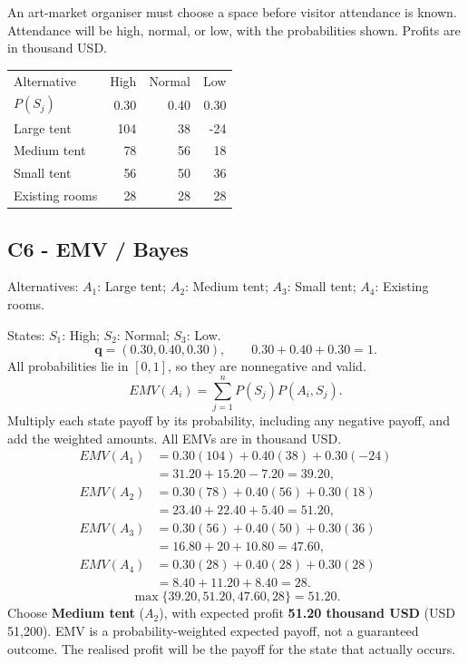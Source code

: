\clearpage
{}
An art-market organiser must choose a space before visitor attendance is known. Attendance will be high, normal, or low, with the probabilities shown. Profits are in thousand USD.
\begin{center}\small\setlength{\tabcolsep}{4pt}
\begin{tabular}{@{}lrrr@{}}\toprule
Alternative&High&Normal&Low\\
$P(S_j)$&0.30&0.40&0.30\\\midrule
Large tent&104&38&-24\\
Medium tent&78&56&18\\
Small tent&56&50&36\\
Existing rooms&28&28&28\\\bottomrule
\end{tabular}\end{center}
\subsection*{C6 - EMV / Bayes }
\label{sol:art-market-space-c6}
Alternatives: $A_1$: Large tent; $A_2$: Medium tent; $A_3$: Small tent; $A_4$: Existing rooms.\par
States: $S_1$: High; $S_2$: Normal; $S_3$: Low.
\[\boldsymbol{q}=(0.30,0.40,0.30),\qquad 0.30+0.40+0.30=1.\]
All probabilities lie in $[0,1]$, so they are nonnegative and valid.
\[EMV(A_i)=\sum_{j=1}^{n}P(S_j)P(A_i,S_j).\]
Multiply each state payoff by its probability, including any negative payoff, and add the weighted amounts. All EMVs are in thousand USD.
\begin{align*}
EMV(A_1)&=0.30(104)+0.40(38)+0.30(-24)\\&=31.20+15.20-7.20=39.20,\\
EMV(A_2)&=0.30(78)+0.40(56)+0.30(18)\\&=23.40+22.40+5.40=51.20,\\
EMV(A_3)&=0.30(56)+0.40(50)+0.30(36)\\&=16.80+20+10.80=47.60,\\
EMV(A_4)&=0.30(28)+0.40(28)+0.30(28)\\&=8.40+11.20+8.40=28.
\end{align*}
\[\max\{39.20,51.20,47.60,28\}=51.20.\]
Choose \textbf{Medium tent} ($A_2$), with expected profit \textbf{51.20 thousand USD} (USD 51,200). EMV is a probability-weighted expected payoff, not a guaranteed outcome. The realised profit will be the payoff for the state that actually occurs.

